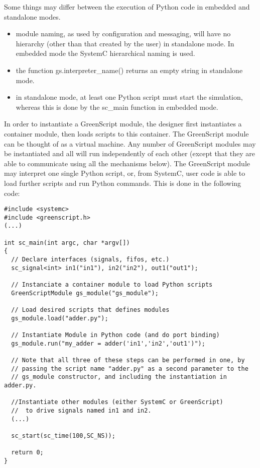 \documentclass[12pt,oneside]{gsbook}
\begin{document}
Some things may differ between the execution of Python code in
embedded and standalone modes.
\begin{itemize}
\item module naming, as used by configuration and messaging, will
have no hierarchy (other than that created by the user) in standalone
mode.  In embedded mode the SystemC hierarchical naming is used.
\item the function gs.interpreter\_name() returns an empty string in
standalone mode.
\item in standalone mode, at least one Python script must start the
simulation, whereas this is done by the sc\_main function in
embedded mode.
\end{itemize}

In order to instantiate a GreenScript module, the designer first
instantiates a container module, then loads scripts to this
container. The GreenScript module can be thought of as a virtual
machine.  Any number of GreenScript modules may be instantiated and all
will run independently of each other (except that they are able to
communicate using all the mechanisms below).  The GreenScript module may
interpret one single Python script, or, from SystemC, user code is able
to load further scripts and run Python commands.  This is done in
the following code:

\lstset{language=C++}
\begin{lstlisting}
#include <systemc>
#include <greenscript.h>
(...)

int sc_main(int argc, char *argv[])
{
  // Declare interfaces (signals, fifos, etc.)
  sc_signal<int> in1("in1"), in2("in2"), out1("out1");

  // Instanciate a container module to load Python scripts
  GreenScriptModule gs_module("gs_module");

  // Load desired scripts that defines modules
  gs_module.load("adder.py");

  // Instantiate Module in Python code (and do port binding)
  gs_module.run("my_adder = adder('in1','in2','out1')");

  // Note that all three of these steps can be performed in one, by
  // passing the script name "adder.py" as a second parameter to the
  // gs_module constructor, and including the instantiation in adder.py.

  //Instantiate other modules (either SystemC or GreenScript)
  //  to drive signals named in1 and in2.
  (...)

  sc_start(sc_time(100,SC_NS));

  return 0;
}
\end{lstlisting}
\lstset{language=Python}
\end{document}
